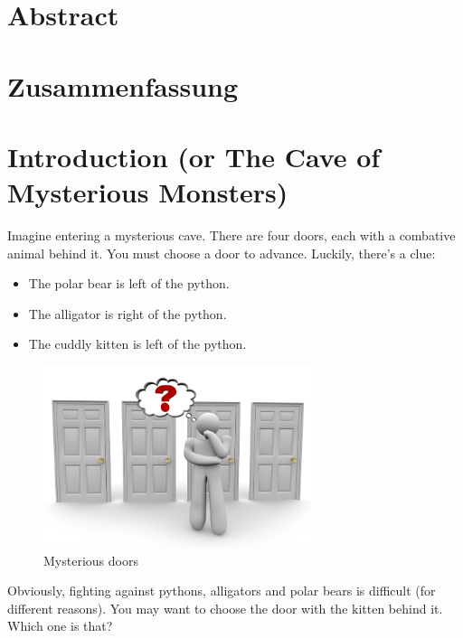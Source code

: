 \documentclass[hidelinks]{scrartcl}
\begin{document}

\section*{Abstract}
\section*{Zusammenfassung}

\newpage
\tableofcontents

\newpage
\printglossary[title=List of Terms]
\newpage

\section{Introduction (or The Cave of Mysterious Monsters)}\label{sec:introduction}
Imagine entering a mysterious cave. There are four doors, each with a combative animal behind it. You must choose a door to advance. Luckily, there's a clue:
\begin{itemize}
\label{item:initial_problem}
\item The polar bear is left of the python.
\item The alligator is right of the python.
\item The cuddly kitten is left of the python.
\end{itemize}

\begin{figure}[!ht]
	\caption{Mysterious doors}
	\label{fig:mysterious_doors}
	\centering
	\includegraphics[width=0.7\textwidth]{Illustrations/choosing_door.jpg}
\end{figure}

Obviously, fighting against pythons, alligators and polar bears is difficult (for different reasons). You may want to choose the door with the kitten behind it. Which one is that? \\
\end{document}
